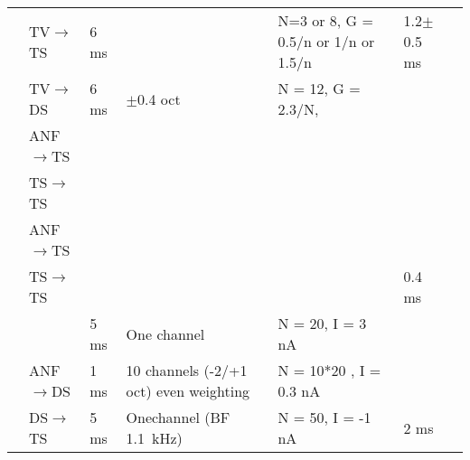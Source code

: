 \begin{longtable}{cXXXXXX}
                                                  &  TV\ensuremath{\rightarrow}TS   &     6 ms      &                                                                           & N=3 or 8, G = 0.5/n or 1/n or 1.5/n                                                    & 1.2$\pm$0.5 ms \\ 
                                                  &  TV\ensuremath{\rightarrow}DS   &     6 ms      &                               $\pm$0.4 oct                                & N = 12, G = 2.3/N,                                                          & \\ 
         \citealp*{WiegrebeMeddis:2004}           &  ANF\ensuremath{\rightarrow}TS  &               &                                                                           &                                                   & \\ 
                                                  &  TS\ensuremath{\rightarrow}TS   &               &                                                                           &                                                   & \\ \midrule
\citealp*{BahmerLangner:2006,BahmerLangner:2006a} &  ANF\ensuremath{\rightarrow}TS  &               &                                                                           &                                                   & \\ 
                                                  &  TS\ensuremath{\rightarrow}TS   &               &                                                                           &                                                   & 0.4 ms\\ \midrule

      \citealp*{PressnitzerMeddisEtAl:2001}       &                                 &    {5 ms}     &                               {One channel}                               & N = 20,     I =  3 nA                       
                                                  & \\ 
                                                  &  ANF\ensuremath{\rightarrow}DS                               &    {1 ms}     &                 {10 channels (-2/+1 oct) even weighting }                 & N = 10*20 , I = 0.3 nA                      
                                                  & \\ 
                                                  & DS\ensuremath{\rightarrow}TS                                &     5 ms      &                     Onechannel (BF 1.1~kHz)                      & N = 50,   I = -1 nA   
                                                  & 2 ms \\ \midrule\midrule


\end{longtable}
